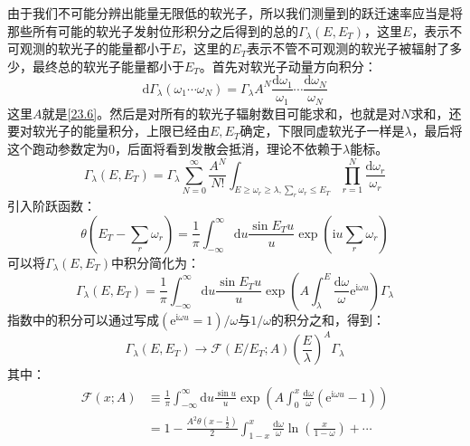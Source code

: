 由于我们不可能分辨出能量无限低的软光子，所以我们测量到的跃迁速率应当是将那些所有可能的软光子发射位形积分之后得到的总的$\Gamma_{\lambda}(E,E_{T})$，这里$E$，表示不可观测的软光子的能量都小于$E$，这里的$E_T$表示不管不可观测的软光子被辐射了多少，最终总的软光子能量都小于$E_T$。首先对软光子动量方向积分：
\begin{equation}
	\mathrm{d}\Gamma_{\lambda}(\omega_{1}\cdots\omega_{N})=\Gamma_{\lambda}A^{N}\frac{\mathrm{d}\omega_{1}}{\omega_{1}}\cdots\frac{\mathrm{d}\omega_{N}}{\omega_{N}}
\end{equation}
这里$A$就是\ref{23.6}。然后是对所有的软光子辐射数目可能求和，也就是对$N$求和，还要对软光子的能量积分，上限已经由$E,E_T$确定，下限同虚软光子一样是$\lambda$，最后将这个跑动参数定为$0$，后面将看到发散会抵消，理论不依赖于$\lambda$能标。
\begin{equation}
	\Gamma_{\lambda}(E,E_{T})=\Gamma_{\lambda}\sum_{N=0}^{\infty}\frac{A^{N}}{N!}\int_{E\geq\omega_{r}\geq\lambda,\sum_{r}\omega_{r}\leq E_{T}}\prod_{r=1}^{N}\frac{\mathrm{d}\omega_{r}}{\omega_{r}}
\end{equation}
引入阶跃函数：
\begin{equation}
	\theta(E_T-\sum_r\omega_r)=\frac{1}{\pi}\int_{-\infty}^{\infty}\mathrm{d}u\frac{\sin E_Tu}{u}\exp\left(\mathrm{i}u\sum_r\omega_r\right)
\end{equation}
可以将$\Gamma_{\lambda}(E,E_{T})$中积分简化为：
\begin{equation}
	\Gamma_{\lambda}(E,E_{T})=\frac{1}{\pi}\int_{-\infty}^{\infty}\mathrm{d}u\frac{\sin E_{T}u}{u}\exp\left(A\int_{\lambda}^{E}\frac{\mathrm{d}\omega}{\omega}\mathrm{e}^{\mathrm{i}\omega u}\right)\Gamma_{\lambda}
\end{equation}
指数中的积分可以通过写成$(\mathrm{e}^{\mathrm{i}\omega u}=1)/\omega$与$1/\omega$的积分之和，得到：
\begin{equation}
	\Gamma_{\lambda}(E,E_{T})\to\mathscr{F}\left(E/E_{T};A\right)\left(\frac{E}{\lambda}\right)^{A}\Gamma_{\lambda}
\end{equation}
其中：
\begin{equation}
	\begin{aligned}
		\mathcal{F}(x;A)& \equiv\frac{1}{\pi}\int_{-\infty}^{\infty}\mathrm{d}u\frac{\sin u}{u}\exp\left(A\int_{0}^{x}\frac{\mathrm{d}\omega}{\omega}(\mathrm{e}^{\mathrm{i}\omega u}-1)\right)  \\
		&=1-\frac{A^{2}\theta(x-\frac{1}{2})}2\int_{1-x}^{x}\frac{\mathrm{d}\omega}\omega\ln\left(\frac{x}{1-\omega}\right)+\cdots 
	\end{aligned}
\end{equation}
